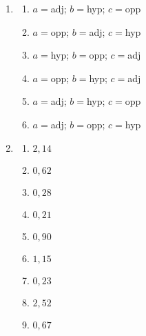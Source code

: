 \begin{solutions}{}{
\begin{enumerate}[itemsep=5pt, label=\textbf{\arabic*}. ] 


\item %
\begin{multicols}{2}
\begin{enumerate}[noitemsep, label=\textbf{(\alph*)} ]
\item $a=$adj; $b=$hyp; $c=$opp
\item $a=$opp; $b=$adj; $c=$hyp
\item $a=$hyp; $b=$opp; $c=$adj
\item $a=$opp; $b=$hyp; $c=$adj
\item $a=$adj; $b=$hyp; $c=$opp
\item $a=$adj; $b=$opp; $c=$hyp
\end{enumerate}
\end{multicols}
\item %
\begin{multicols}{2}
\begin{enumerate}[noitemsep, label=\textbf{(\alph*)} ]
\item $2,14$%
\item $0,62$%
\item $0,28$%
\item $0,21$%
\item $0,90$%
\item $1,15$%
\item $0,23$%
\item $2,52$%
\item $0,67$%
\end{enumerate}


\end{multicols}
\end{enumerate}}
\end{solutions}
